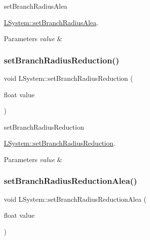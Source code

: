 set\+Branch\+Radius\+Alea 

\hyperlink{classLSystem_ae33f0faa46188cde512df810889b0f21}{L\+System\+::set\+Branch\+Radius\+Alea}.


\begin{DoxyParams}{Parameters}
{\em value} & \\
\hline
\end{DoxyParams}
\mbox{\label{classLSystem_a7a82ce235a7b591c862ddeb1daed1964}} 
\subsubsection{\texorpdfstring{set\+Branch\+Radius\+Reduction()}{setBranchRadiusReduction()}}
{\footnotesize\ttfamily void L\+System\+::set\+Branch\+Radius\+Reduction (\begin{DoxyParamCaption}\item[{float}]{value }\end{DoxyParamCaption})}



set\+Branch\+Radius\+Reduction 

\hyperlink{classLSystem_a7a82ce235a7b591c862ddeb1daed1964}{L\+System\+::set\+Branch\+Radius\+Reduction}.


\begin{DoxyParams}{Parameters}
{\em value} & \\
\hline
\end{DoxyParams}
\mbox{\label{classLSystem_abc2ccf751660dc5ffb4e90db527bed38}} 
\subsubsection{\texorpdfstring{set\+Branch\+Radius\+Reduction\+Alea()}{setBranchRadiusReductionAlea()}}
{\footnotesize\ttfamily void L\+System\+::set\+Branch\+Radius\+Reduction\+Alea (\begin{DoxyParamCaption}\item[{float}]{value }\end{DoxyParamCaption})}



